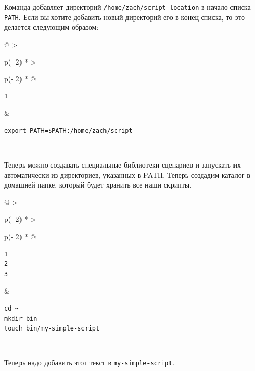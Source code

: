 \documentclass{article}
\begin{document}
Команда добавляет директорий \texttt{/home/zach/script-location} в
начало списка \texttt{PATH}. Если вы хотите добавить новый директорий
его в конец списка, то это делается следующим образом:

\begin{longtable}[]{@{}
  >{\raggedright\arraybackslash}p{(\columnwidth - 2\tabcolsep) * }
  >{\raggedright\arraybackslash}p{(\columnwidth - 2\tabcolsep) * }@{}}
\toprule
\endhead
\begin{minipage}[t]{\linewidth}\raggedright
\begin{verbatim}
1
\end{verbatim}
\end{minipage} & \begin{minipage}[t]{\linewidth}\raggedright
\begin{verbatim}
export PATH=$PATH:/home/zach/script
\end{verbatim}
\end{minipage} \\ \addlinespace
\bottomrule
\end{longtable}

Теперь можно создавать специальные библиотеки сценариев и запускать их
автоматически из директориев, указанных в PATH. Теперь создадим каталог
в домашней папке, который будет хранить все наши скрипты.

\begin{longtable}[]{@{}
  >{\raggedright\arraybackslash}p{(\columnwidth - 2\tabcolsep) * }
  >{\raggedright\arraybackslash}p{(\columnwidth - 2\tabcolsep) * }@{}}
\toprule
\endhead
\begin{minipage}[t]{\linewidth}\raggedright
\begin{verbatim}
1
2
3
\end{verbatim}
\end{minipage} & \begin{minipage}[t]{\linewidth}\raggedright
\begin{verbatim}
cd ~
mkdir bin
touch bin/my-simple-script
\end{verbatim}
\end{minipage} \\ \addlinespace
\bottomrule
\end{longtable}

Теперь надо добавить этот текст в \texttt{my-simple-script}.
\end{document}
